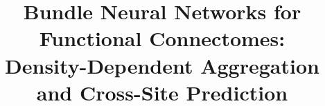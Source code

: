 \title{Bundle Neural Networks for Functional Connectomes:\\
Density-Dependent Aggregation and Cross-Site Prediction}
\author{
}
